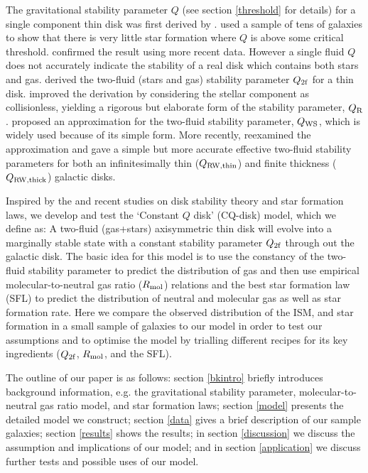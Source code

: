 \documentclass[12pt,preprint]{aastex}
\begin{document}
The gravitational stability parameter $Q$ (see section \ref{threshold} for details)  for a
single component thin disk was first derived by
\citet{too64}. \citet{ken89} used a sample of tens of galaxies to show that there is very little star
formation where $Q$ is above some critical threshold. \citet{mar01}
confirmed the result using more recent data. However a single fluid $Q$
does not accurately indicate the stability of a real disk which contains
both stars and gas.  \citet{jog84} derived the two-fluid (stars and gas)
stability parameter $Q_{\rm 2f}$ for a thin disk. \citet{raf01} improved
the derivation by  considering the stellar component as collisionless, 
yielding a rigorous but elaborate form of the stability parameter, $Q_{\rm R}$.  \citet{wan94} proposed an approximation for the two-fluid stability parameter, $Q_{\rm WS}$, which is widely used because of its simple form.  More recently, \citet{rom11} reexamined the \citet{wan94} approximation and gave a simple but more accurate effective two-fluid stability parameters for both an infinitesimally  thin ($Q_{\rm RW,thin}$) and finite thickness  ($Q_{\rm RW,thick}$) galactic disks. 



Inspired by the \citet{qui72} and recent studies on disk stability theory and star formation laws, we develop and test the `Constant $Q$ disk' (CQ-disk) model, which we define as: A two-fluid (gas+stars) axisymmetric thin disk will evolve into a marginally stable state with a constant stability parameter $Q_{\rm 2f}$ through out the  galactic disk.  The basic idea for this model is to use the constancy of the two-fluid stability parameter  to predict the distribution of gas and then use empirical molecular-to-neutral gas ratio ($R_{\rm mol}$) relations and the best star formation law (SFL) to predict the distribution of neutral and molecular gas as well as star formation rate. Here we compare the observed distribution of the ISM, and star formation in a small sample of galaxies to our model in order to test our assumptions and to optimise the model by trialling different recipes for its key ingredients ($Q_{\rm 2f}$, $R_{\rm mol}$, and the SFL).



The outline of our paper is as follows: section \ref{bkintro} briefly introduces background information, e.g. the gravitational stability parameter, molecular-to-neutral gas ratio model, and star formation laws; section \ref{model} presents the detailed model we construct;  section \ref{data} gives a brief description of our sample galaxies; section \ref{results} shows the results;  in section \ref{discussion} we discuss the assumption and implications of our model; and in section \ref{application} we discuss further tests and possible uses of our model. 
\end{document}
